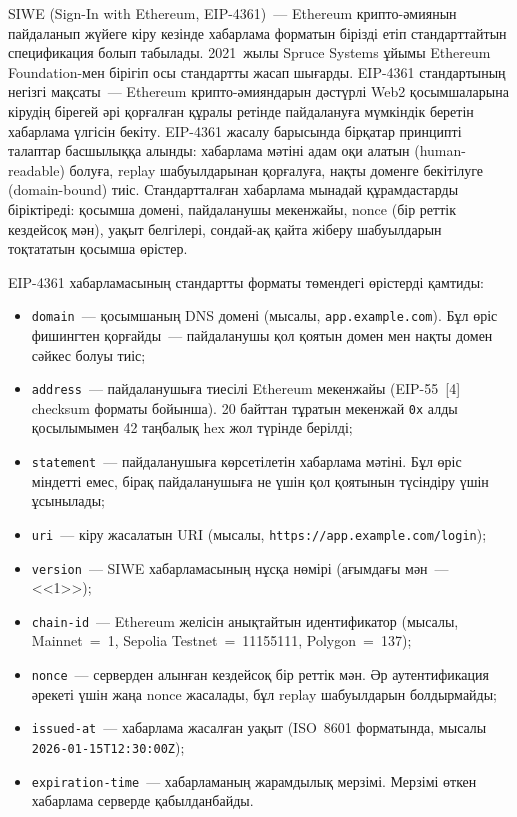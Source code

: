 \documentclass[14pt,a4paper]{extarticle}
\begin{document}
SIWE (Sign-In with Ethereum, EIP-4361)~--- Ethereum крипто-әмиянын пайдаланып жүйеге кіру кезінде хабарлама форматын бірізді етіп стандарттайтын спецификация болып табылады. 2021~жылы Spruce Systems ұйымы Ethereum Foundation-мен бірігіп осы стандартты жасап шығарды. EIP-4361 стандартының негізгі мақсаты~--- Ethereum крипто-әмияндарын дәстүрлі Web2 қосымшаларына кірудің бірегей әрі қорғалған құралы ретінде пайдалануға мүмкіндік беретін хабарлама үлгісін бекіту. EIP-4361 жасалу барысында бірқатар принципті талаптар басшылыққа алынды: хабарлама мәтіні адам оқи алатын (human-readable) болуға, replay шабуылдарынан қорғалуға, нақты доменге бекітілуге (domain-bound) тиіс. Стандартталған хабарлама мынадай құрамдастарды біріктіреді: қосымша домені, пайдаланушы мекенжайы, nonce (бір реттік кездейсоқ мән), уақыт белгілері, сондай-ақ қайта жіберу шабуылдарын тоқтататын қосымша өрістер.

EIP-4361 хабарламасының стандартты форматы төмендегі өрістерді қамтиды:
\begin{itemize}[nosep]
\item \texttt{domain}~--- қосымшаның DNS домені (мысалы, \texttt{app.example.com}). Бұл өріс фишингтен қорғайды~--- пайдаланушы қол қоятын домен мен нақты домен сәйкес болуы тиіс;
\item \texttt{address}~--- пайдаланушыға тиесілі Ethereum мекенжайы (EIP-55~[4] checksum форматы бойынша). 20 байттан тұратын мекенжай \texttt{0x} алды қосылымымен 42 таңбалық hex жол түрінде берілді;
\item \texttt{statement}~--- пайдаланушыға көрсетілетін хабарлама мәтіні. Бұл өріс міндетті емес, бірақ пайдаланушыға не үшін қол қоятынын түсіндіру үшін ұсынылады;
\item \texttt{uri}~--- кіру жасалатын URI (мысалы, \texttt{https://app.example.com/login});
\item \texttt{version}~--- SIWE хабарламасының нұсқа нөмірі (ағымдағы мән~--- <<1>>);
\item \texttt{chain-id}~--- Ethereum желісін анықтайтын идентификатор (мысалы, Mainnet~=~1, Sepolia Testnet~=~11155111, Polygon~=~137);
\item \texttt{nonce}~--- серверден алынған кездейсоқ бір реттік мән. Әр аутентификация әрекеті үшін жаңа nonce жасалады, бұл replay шабуылдарын болдырмайды;
\item \texttt{issued-at}~--- хабарлама жасалған уақыт (ISO~8601 форматында, мысалы \texttt{2026-01-15T12:30:00Z});
\item \texttt{expiration-time}~--- хабарламаның жарамдылық мерзімі. Мерзімі өткен хабарлама серверде қабылданбайды.
\end{itemize}
\end{document}
